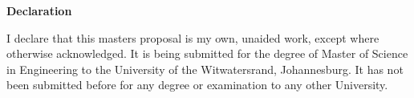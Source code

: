 \documentclass[MScDiss,altheaders,colorlinks,a4paper]{wits-eie-thesis}
\begin{document}
%		
%		
%		
%		
%		
%	
%		
%		
%		
%		
%		
%		
%		

\clearpage
{}
\vspace*{50pt}
{ \raggedright \huge \bfseries Declaration \par
	\nobreak
	\vskip 40pt
}

I declare that this %
masters proposal is my own, unaided work, except where otherwise acknowledged. It is being submitted for the degree of Master of Science in Engineering to the University of the Witwatersrand, Johannesburg. It has not been submitted before for any degree or examination to any other University.
\end{document}
